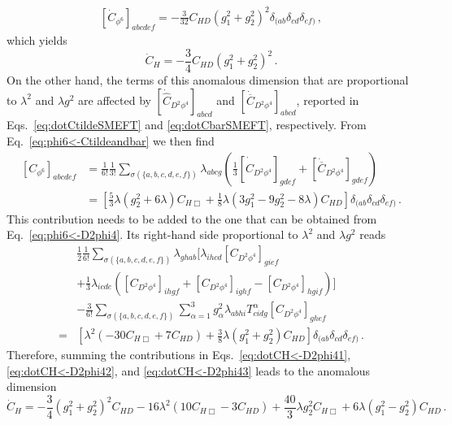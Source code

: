 \begin{align}
    \left[\dot C_{\phi^6}\right]_{abcdef} = -\frac{3}{32}C_{HD}(g_1^2+g_2^2)^2 \delta_{(ab}\delta_{cd}\delta_{ef)}\,,
\end{align}
which yields
\begin{equation}
    \dot C_H = -\frac{3}{4}C_{HD}(g_1^2+g_2^2)^2\,.\label{eq:dotCH<-D2phi41}
\end{equation}
On the other hand, the terms of this anomalous dimension that are proportional to $\lambda^2$ and $\lambda g^2$ are affected by $[\dot{\widehat C}_{D^2\phi^4}]_{abcd}$ and $[\dot{\overline C}_{D^2\phi^4}]_{abcd}$, reported in Eqs.~\eqref{eq:dotCtildeSMEFT} and \eqref{eq:dotCbarSMEFT}, respectively.
From Eq.~\eqref{eq:phi6<-Ctildeandbar} we then find
\begin{align}
    \left[C_{\phi^6}\right]_{abcdef} &= \frac{1}{6!}\frac{1}{3!}\sum_{\sigma(\{a,b,c,d,e,f\})}\lambda_{abcg}\left(\frac{1}{3}
    \left[\dot{\widehat C}_{D^2\phi^4}\right]_{gdef}+\left[\dot{\overline C}_{D^2\phi^4}\right]_{gdef}
    \right) \nonumber \\
    &= \left[
    \frac{5}{3}\lambda (g_2^2+6\lambda)C_{H\Box} + \frac{1}{8}\lambda (3g_1^2-9g_2^2-8\lambda)C_{HD}
    \right] \delta_{(ab}\delta_{cd}\delta_{ef)}\label{eq:dotCH<-D2phi42}\,.
\end{align}
This contribution needs to be added to the one that can be obtained from Eq.~\eqref{eq:phi6<-D2phi4}. Its right-hand side proportional to $\lambda^2$ and $\lambda g^2$ reads 
\begin{align}
    &\frac{1}{2}\frac{1}{6!}\sum_{\sigma(\{a,b,c,d,e,f\})}\lambda_{ghab}\bigg[\lambda_{ihcd}\left[ C_{D^2\phi^4}\right]_{gief}\nonumber \\
    &+\frac{1}{3}\lambda_{icde}\left(\left[C_{D^2\phi^4}\right]_{ihgf}+\left[C_{D^2\phi^4}\right]_{ighf}-\left[C_{D^2\phi^4}\right]_{hgif}\right)\bigg]\nonumber \\
    &-\frac{3}{6!} \sum_{\sigma(\{a,b,c,d,e,f\})}\sum_{\alpha=1}^{3} g_\alpha^2 \lambda_{abhi} T^\alpha_{cidg} \left[C_{D^2\phi^4}\right]_{ghef}\nonumber \\
    = & \left[\lambda^2(-30C_{H\Box}+7C_{HD})+\frac{3}{8}\lambda (g_1^2 +g_2^2)C_{HD}\right]\delta_{(ab}\delta_{cd}\delta_{ef)}\label{eq:dotCH<-D2phi43}\,.
\end{align}
Therefore, summing the contributions in Eqs.~\eqref{eq:dotCH<-D2phi41}, \eqref{eq:dotCH<-D2phi42}, and \eqref{eq:dotCH<-D2phi43} leads to the anomalous dimension 
\begin{equation}
    \dot C_H = -\frac{3}{4}(g_1^2+g_2^2)^2C_{HD} -16 \lambda^2(10 C_{H\Box }-3C_{HD}) + \frac{40}{3}\lambda g_2^2 C_{H\Box} + 6\lambda (g_1^2-g_2^2)C_{HD} \,.
\end{equation}

